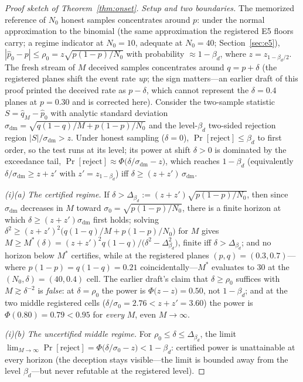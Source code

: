\begin{proof}[Proof sketch of Theorem~\ref{thm:onset}]
\emph{Setup and two boundaries.} The memorized reference of $N_0$ honest
samples concentrates around $p$: under the normal approximation to the
binomial (the same approximation the registered E5 floors carry; a regime
indicator at $N_0=10$, adequate at $N_0=40$; Section~\ref{sec:e5}),
$|\hat p_0-p|\le\rho_0=z\sqrt{p(1-p)/N_0}$ with probability
$\approx1-\beta_d$, where $z=z_{1-\beta_d/2}$. The fresh stream of $M$
deceived samples concentrates around $q=p+\delta$ (the registered planes
shift the event rate \emph{up}; the sign matters---an earlier draft of this
proof printed the deceived rate as $p-\delta$, which cannot represent the
$\delta=0.4$ planes at $p=0.30$ and is corrected here). Consider the
two-sample statistic $S=\hat q_M-\hat p_0$ with analytic standard
deviation
$\sigma_{\mathrm{dm}}=\sqrt{q(1-q)/M+p(1-p)/N_0}$ and the level-$\beta_d$
two-sided rejection region $|S|/\sigma_{\mathrm{dm}}>z$. Under honest
sampling ($\delta=0$), $\Pr[\text{reject}]\le\beta_d$ to first order, so
the test runs at its level; its power at shift $\delta>0$ is dominated by
the exceedance tail,
$\Pr[\text{reject}]\approx\Phi\!\bigl(\delta/\sigma_{\mathrm{dm}}-z\bigr)$,
which reaches $1-\beta_d$ (equivalently $\delta/\sigma_{\mathrm{dm}}\ge z+z'$ with $z'=z_{1-\beta_d}$) iff
$\delta\ge(z+z')\,\sigma_{\mathrm{dm}}$.

\emph{(i)(a) The certified regime.} If
$\delta>\Delta_{\beta_d}:=(z+z')\sqrt{p(1-p)/N_0}$, then since
$\sigma_{\mathrm{dm}}$ decreases in $M$ toward
$\sigma_0=\sqrt{p(1-p)/N_0}$, there is a finite horizon at which
$\delta\ge(z+z')\sigma_{\mathrm{dm}}$ first holds; solving
$\delta^{2}\ge(z+z')^{2}\bigl(q(1-q)/M+p(1-p)/N_0\bigr)$ for $M$ gives
$M\ge M^{*}(\delta)=(z+z')^{2}q(1-q)/\bigl(\delta^{2}-\Delta_{\beta_d}^{2}\bigr)$,
finite iff $\delta>\Delta_{\beta_d}$; and no horizon below
$M^{*}$ certifies, while at the registered planes
$(p,q)=(0.3,0.7)$---where $p(1-p)=q(1-q)=0.21$ coincidentally---$M^{*}$
evaluates to $30$ at the $(N_0,\delta)=(40,0.4)$ cell. The earlier
draft's claim that $\delta\ge\rho_0$ suffices with $M\gtrsim\delta^{-2}$
is \emph{false}: at $\delta=\rho_0$ the power is
$\Phi\!\bigl(z-z\bigr)=0.50$, not $1-\beta_d$; and at the two middle
registered cells ($\delta/\sigma_0=2.76<z+z'=3.60$) the power is
$\Phi(0.80)=0.79<0.95$ for \emph{every} $M$, even $M\to\infty$.

\emph{(i)(b) The uncertified middle regime.} For
$\rho_0\le\delta\le\Delta_{\beta_d}$, the limit
$\lim_{M\to\infty}\Pr[\mathrm{reject}]
=\Phi\!\bigl(\delta/\sigma_0-z\bigr)<1-\beta_d$: certified power is
unattainable at every horizon (the deception stays visible---the limit is
bounded away from the level $\beta_d$---but never refutable at the
registered level).


\end{proof}
